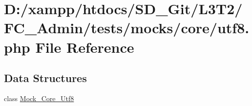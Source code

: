 \hypertarget{tests_2mocks_2core_2_utf8_8php}{}\section{D\+:/xampp/htdocs/\+S\+D\+\_\+\+Git/\+L3\+T2/\+F\+C\+\_\+\+Admin/tests/mocks/core/utf8.php File Reference}
\label{tests_2mocks_2core_2_utf8_8php}
\subsection*{Data Structures}
\begin{DoxyCompactItemize}
\item 
class \hyperlink{class_mock___core___utf8}{Mock\+\_\+\+Core\+\_\+\+Utf8}
\end{DoxyCompactItemize}
